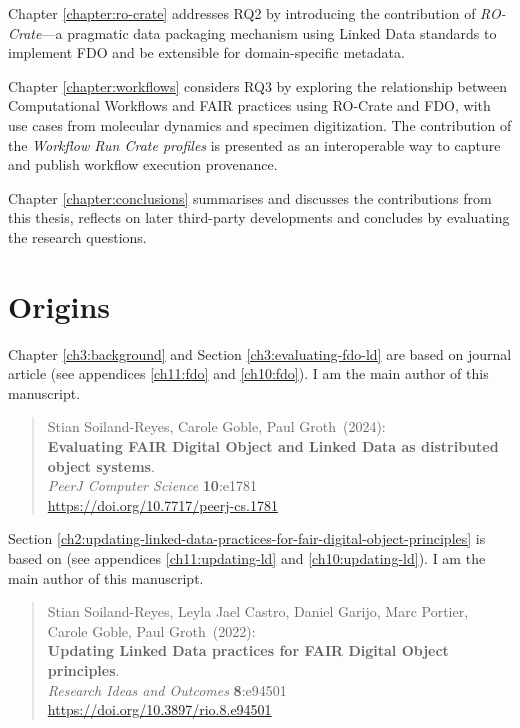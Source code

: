 Chapter \vref{chapter:ro-crate} addresses RQ2 by introducing the contribution of \emph{RO-Crate}---a pragmatic data packaging mechanism using Linked Data standards to implement FDO and be extensible for domain-specific metadata.  

Chapter \vref{chapter:workflows} considers RQ3 by exploring the relationship between Computational Workflows and FAIR practices using RO-Crate and FDO, with use cases from molecular dynamics and specimen digitization. The contribution of the \emph{Workflow Run Crate profiles} is presented as an interoperable way to capture and publish workflow execution provenance. 

Chapter \vref{chapter:conclusions} summarises and discusses the contributions from this thesis, reflects on later third-party developments and concludes by evaluating the research questions.


\section{Origins}
\label{intro:origins}

Chapter \ref{ch3:background} and Section \ref{ch3:evaluating-fdo-ld} are based on journal article \cite{Soiland-Reyes 2024b}  (see appendices \ref{ch11:fdo} and \ref{ch10:fdo}). I am the main author of this manuscript.

\begin{quote}
    \small
Stian Soiland-Reyes, Carole Goble, Paul Groth~(2024): \\
\textbf{Evaluating FAIR Digital Object and Linked Data as distributed object systems}.\\
\emph{PeerJ Computer Science} \textbf{10}:e1781 \\
\url{https://doi.org/10.7717/peerj-cs.1781} 
\end{quote}

Section \ref{ch2:updating-linked-data-practices-for-fair-digital-object-principles} is based on \cite{Soiland-Reyes 2022d} (see appendices \ref{ch11:updating-ld} and \ref{ch10:updating-ld}). I am the main author of this manuscript.

\begin{quote}
    \small
    Stian Soiland-Reyes, Leyla Jael Castro, Daniel Garijo, Marc Portier, Carole Goble, Paul Groth~(2022): \\
    \textbf{Updating Linked Data practices for FAIR Digital Object principles}. \\
    \emph{Research Ideas and Outcomes} \textbf{8}:e94501 \\
    \url{https://doi.org/10.3897/rio.8.e94501}
\end{quote}

